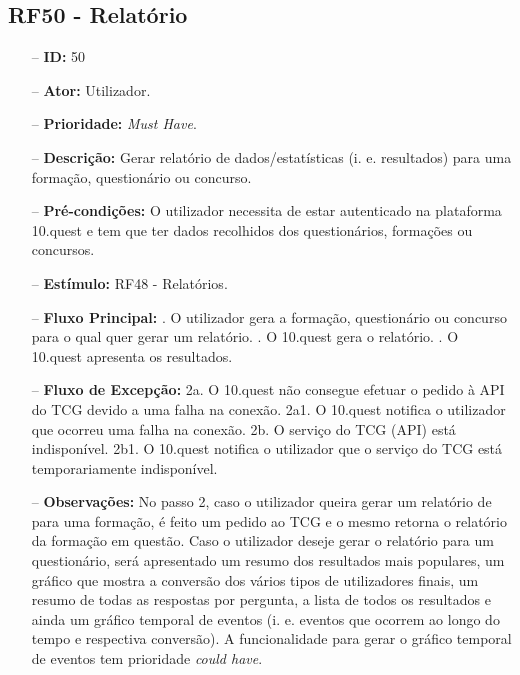 \subsection{RF50 - Relatório}
\begin{itemize}
	\item[--] \textbf{ID:} 50
	\item[--]  \textbf{Ator:} Utilizador.
	\item[--]  \textbf{Prioridade:} \textit{Must Have}.
	\item[--]  \textbf{Descrição:} Gerar relatório de dados/estatísticas (i. e. resultados) para uma formação, questionário ou concurso.
	\item[--]  \textbf{Pré-condições:} O utilizador necessita de estar autenticado na plataforma 10.quest e tem que ter dados recolhidos dos questionários, formações ou concursos.
	\item[--]  \textbf{Estímulo:} RF48 - Relatórios.
	\item[--]  \textbf{Fluxo Principal:} 
		. O utilizador gera a formação, questionário ou concurso para o qual quer gerar um relatório.
		. O 10.quest gera o relatório.
		. O 10.quest apresenta os resultados.
	\item[--]  \textbf{Fluxo de Excepção:} 
		\subitem 2a. O 10.quest não consegue efetuar o pedido à API do TCG devido a uma falha na conexão.
		\subitem 2a1. O 10.quest notifica o utilizador que ocorreu uma falha na conexão.
		\subitem 2b. O serviço do TCG (API) está indisponível.
		\subitem 2b1. O 10.quest notifica o utilizador que o serviço do TCG está temporariamente indisponível. 
	\item[--]  \textbf{Observações:} No passo 2, caso o utilizador queira gerar um relatório de para uma formação, é feito um pedido ao TCG e o mesmo retorna o relatório da formação em questão.
	Caso o utilizador deseje gerar o relatório para um questionário, será apresentado um resumo dos resultados mais populares, um gráfico que mostra a conversão dos vários tipos de utilizadores finais, um resumo de todas as respostas por pergunta, a lista de todos os resultados e ainda um gráfico temporal de eventos (i. e. eventos que ocorrem ao longo do tempo e respectiva conversão). A funcionalidade para gerar o gráfico temporal de eventos tem prioridade \textit{could have}.
\end{itemize}
\newpage


